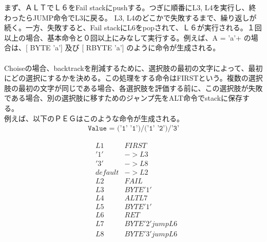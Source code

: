 \documentclass[12pt,oneside]{report}
\begin{document}
まず、ＡＬＴでＬ６をFail stackにpushする。つぎに順番にL3, L4を実行し、終わったらJUMP命令でL3に戻る。 L3, L4のどこかで失敗するまで、繰り返しが続く。一方、失敗すると、Fail stackにL6をpopされて、Ｌ６が実行される。１回以上の場合、基本命令と０回以上にみなして実行する。例えば、A = 'a'+ の場合は、[ BYTE 'a']  及び [ RBYTE 'a'] のように命令が生成される。\\
\\

Choiseの場合、backtrackを削減するために、選択肢の最初の文字によって、最初にどの選択にするかを決める。この処理をする命令はFIRSTという。複数の選択肢の最初の文字が同じである場合、各選択肢を評価する前に、この選択肢が失敗である場合、別の選択肢に移すためのジャンプ先をALT命令でstackに保存する。\\
例えば、以下のＰＥＧはこのような命令が生成される。
\begin{eqnarray}\nonumber
\texttt{Value = ('1' '1')/('1' '2')/'3'}\nonumber
\end{eqnarray}

\begin{eqnarray}\nonumber
&L1& FIRST\\\nonumber 
	&'1'& -> L3\\\nonumber
	&'3'& -> L8\\\nonumber
	&default& -> L2\\\nonumber
&L2& FAIL\\\nonumber
&L3& BYTE '1'\\\nonumber
&L4& ALT L7\\\nonumber
&L5& BYTE '1'\\\nonumber
&L6& RET\\\nonumber
&L7& BYTE '2' jump L6\\\nonumber
&L8& BYTE '3' jump L6\\\nonumber
\end{eqnarray}
\end{document}
